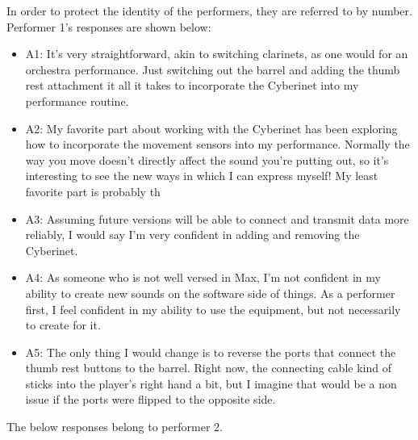In order to protect the identity of the performers, they are referred to by number. Performer 1's responses are shown below: %

\begin{itemize}
    \item A1: It's very straightforward, akin to switching clarinets, as one would for an orchestra performance. Just switching out the barrel and adding the thumb rest attachment it all it takes to incorporate the Cyberinet into my performance routine.
    \item A2: My favorite part about working with the Cyberinet has been exploring how to incorporate the movement sensors into my performance. Normally the way you move doesn't directly affect the sound you're putting out, so it's interesting to see the new ways in which I can express myself! My least favorite part is probably th
    \item A3: Assuming future versions will be able to connect and transmit data more reliably, I would say I'm very confident in adding and removing the Cyberinet.
    \item A4: As someone who is not well versed in Max, I'm not confident in my ability to create new sounds on the software side of things. As a performer first, I feel confident in my ability to use the equipment, but not necessarily to create for it.
    \item A5: The only thing I would change is to reverse the ports that connect the thumb rest buttons to the barrel. Right now, the connecting cable kind of sticks into the player's right hand a bit, but I imagine that would be a non issue if the ports were flipped to the opposite side.
\end{itemize}


The below responses belong to performer 2. %

